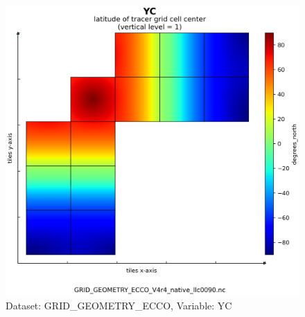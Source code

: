\begin{figure}[H]
\centering
\includegraphics[scale=0.55]{../images/plots/native_plots_coords/Geometry_Parameters_for_the_Lat-Lon-Cap_90_(llc90)_Native_Model_Grid_(Version_4_Release_4)/YC.png}
\caption{Dataset: GRID\_GEOMETRY\_ECCO, Variable: YC}
\label{tab:table-GRID_GEOMETRY_ECCO_YC-Plot}
\end{figure}
\newpage
\pagebreak
